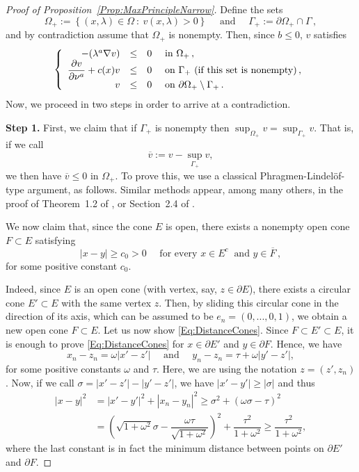 \documentclass[twoside,leqno,symbols-for-thanks, draft]{rmi}
\numberwithin{equation}{section}
\theoremstyle{definition}
\newcommand\beqc[1]{\left\{\begin{array}{#1}}
\newcommand\eeqc{\end{array} \right.}
\def\PDEsystem{rcll}
\let\div\relax
\DeclareMathOperator{\div}{div}
\begin{document}
\begin{proof}[Proof of Proposition~\ref{Prop:MaxPrincipleNarrow}] 
	Define the sets 
	$$
	\Omega_+ := \left\{(x,\lambda) \in \Omega \ : \ v(x,\lambda)>0 \right\} 
	\quad \text{ and } \quad 
	\Gamma_+ := \partial \Omega_+ \cap \Gamma\,,
	$$ 
	and by contradiction assume that $\Omega_+$ is nonempty. Then, since $b\leq 0$,  $v$ satisfies
	$$
	\beqc{\PDEsystem}
	-\div(\lambda^a \nabla v) &\leq& 0 & \text{ in } \Omega_+\,, \\
	\dfrac{\partial v}{\partial \nu^a}  + c(x) v &\leq & 0 & \text{ on } \Gamma_+ \text{ (if this set is nonempty)}\,, \\
	v & \leq & 0 & \text{ on } \partial \Omega_+ \setminus \Gamma_+\,.
	\eeqc
	$$
	Now, we proceed in two steps in order to arrive at a contradiction.
	
	\textbf{Step 1.}
	First, we claim that if $\Gamma_+$ is nonempty then $\sup_{\Omega_+} v = \sup_{\Gamma_+} v $. That is, if we call 
	$$
	\overline{v} := v - \sup_{\Gamma_+} v,
	$$
	we then have $\overline{v} \leq 0$ in $\Omega_+$. To prove this, we use a classical Phragmen-Lindel\"of-type argument, as follows. Similar methods appear, among many others, in the proof of Theorem~1.2 of \cite{BerestyckiCaffarelliNiremberg-Monotonicity}, or Section~2.4 of \cite{CabreSolaMorales}.
	
	We now claim that, since the cone $E$ is open, there exists a nonempty open cone $F \subset E$ satisfying
	\begin{equation}
	\label{Eq:DistanceCones}
	|x-y| \geq c_0 > 0 \quad \text{ for every } x\in E^c \ \text{ and } y \in \overline{F}\,,
	\end{equation}
	for some positive constant $c_0$.
	
	Indeed, since $E$ is an open cone (with vertex, say, $z\in \partial E$), there exists a circular cone $E'\subset E$ with the same vertex $z$. Then, by sliding this circular cone in the direction of its axis, which can be assumed to be $e_n = (0,...,0,1)$, we obtain a new open cone $F\subset E$. Let us now show \eqref{Eq:DistanceCones}. Since $F \subset E' \subset E$, it is enough to prove \eqref{Eq:DistanceCones} for $x\in \partial E'$ and $ y\in\partial F$. Hence, we have
	$$x_n-z_n = \omega |x'-z'| \quad \text{ and } \quad y_n-z_n = \tau + \omega |y'-z'|, $$
	for some positive constants $\omega$ and $\tau$. Here, we are using the notation $z = (z',z_n)$. Now, if we call $\sigma = |x'-z'|-|y'-z'|$, we have $|x'-y'|\geq |\sigma|$ and thus
	\begin{align*}
	|x-y|^2 &= |x'-y'|^2 + |x_n-y_n|^2 \geq \sigma^2 + (\omega \sigma - \tau)^2   \\
	&= \left ( \sqrt{1+\omega^2} \sigma - \dfrac{\omega\tau}{\sqrt{1+\omega^2}}\right )^2 + \dfrac{\tau^2}{1+\omega^2}\geq\dfrac{\tau^2}{1+\omega^2},
	\end{align*}
	where the last constant is in fact the minimum distance between points on $\partial E'$ and $\partial F$. 
	

\end{proof}
\end{document}
